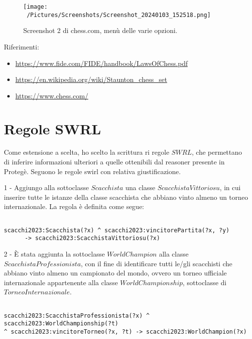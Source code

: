 \documentclass[12pt]{book}
\begin{document}
\begin{figure}[h]
  \caption{Screenshot 2 di chess.com, menù delle varie opzioni.}
  \centering
  \label{fig:chess.com_2}
  \texttt{[image: ~/Pictures/Screenshots/Screenshot\_20240103\_152518.png]}
\end{figure}

Riferimenti:
\begin{itemize}

  \item \url{https://www.fide.com/FIDE/handbook/LawsOfChess.pdf}
  \item \url{https://en.wikipedia.org/wiki/Staunton_chess_set}
  \item \url{https://www.chess.com/}

\end{itemize}

\chapter{Regole SWRL}

Come estensione a scelta, ho scelto la scrittura ri regole $SWRL$, che
permettano di inferire informazioni ulteriori a quelle ottenibili dal
reasoner presente in Protegè.
Seguono le regole swirl con relativa giustificazione.

1 - Aggiungo alla sottoclasse $Scacchista$ una classe
$ScacchistaVittoriosu$, in cui inserire tutte le istanze della classe
scacchista che abbiano vinto almeno un torneo internazionale.
La regola è definita come segue:
\begin{verbatim}

scacchi2023:Scacchista(?x) ^ scacchi2023:vincitorePartita(?x, ?y) 
      -> scacchi2023:ScacchistaVittoriosu(?x)

\end{verbatim}

2 - È stata aggiunta la sottoclasse $WorldChampion$ alla classe
$ScacchistaProfessionista$, con il fine di identificare tutti le/gli
scacchisti che abbiano vinto almeno un campionato del mondo, ovvero
un torneo ufficiale internazionale appartenente alla classe
$WorldChampionship$, sottoclasse di $TorneoInternazionale$.

\begin{verbatim}

scacchi2023:ScacchistaProfessionista(?x) ^ scacchi2023:WorldChampionship(?t) 
^ scacchi2023:vincitoreTorneo(?x, ?t) -> scacchi2023:WorldChampion(?x)

\end{verbatim}
\end{document}
